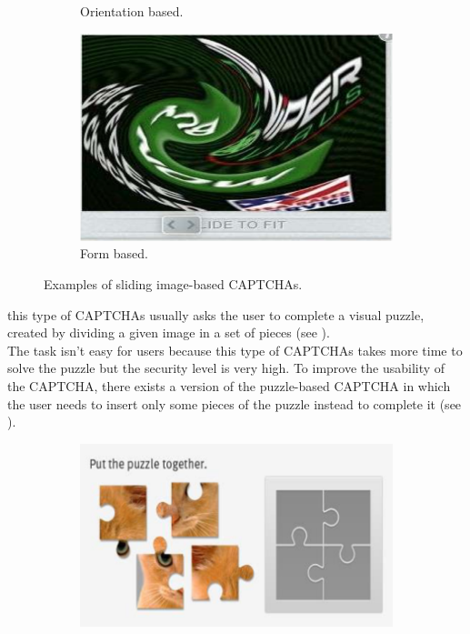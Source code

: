 \begin{itemize}
{\begin{figure}[h]
\begin{subfigure}[b]{0.48\textwidth}
	     \caption{\footnotesize{Orientation based.}}
     \end{subfigure}
     \hfill
     \begin{subfigure}[b]{0.48\textwidth}
         \centering
         \includegraphics[width=.9\linewidth]{Images/StateOfArt/sliding_image_CAPTCHA2}
	     \caption{\footnotesize{Form based.}}
     \end{subfigure}
     \caption{\footnotesize{Examples of sliding image-based CAPTCHAs.}}
     \label{soa:sliding_image}
\end{figure}
}
{this type of CAPTCHAs usually asks the user to complete a visual puzzle, created by dividing a given image in a set of pieces\cite{survey_CAPTCHA} (see ).\\
The task isn't easy for users because this type of CAPTCHAs takes more time to solve the puzzle but the security level is very high\cite{survey_CAPTCHA}. To improve the usability of the CAPTCHA, there exists a version of the puzzle-based CAPTCHA in which the user needs to insert only some pieces of the puzzle instead to complete it (see ).
\begin{figure}[h]
     \centering
     \begin{subfigure}[b]{0.48\textwidth}
         \centering
         \includegraphics[width=.6\linewidth]{Images/StateOfArt/puzzle_CAPTCHA}

\end{subfigure}
\end{figure}}
\end{itemize}

